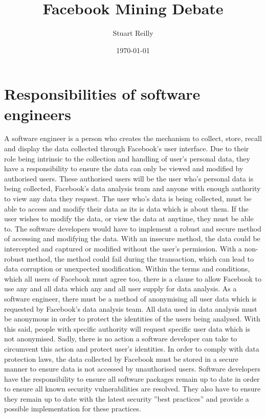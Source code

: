 \documentclass[12pt]{article}
\title{Facebook Mining Debate}
\author{Stuart Reilly}
\date{\today}
\begin{document}
\maketitle
\section{Responsibilities of software engineers}
	A software engineer is a person who creates the mechanism to collect, store, recall and display the data collected through Facebook's user interface.
	Due to their role being intrinsic to the collection and handling of user's personal data, they have a responsibility to ensure the data can only be viewed and modified by authorised users.
	These authorised users will be the user who's personal data is being collected, Facebook's data analysis team and anyone with enough authority to view any data they request.
	The user who's data is being collected, must be able to access and modify their data as its is data which is about them.
	If the user wishes to modify the data, or view the data at anytime, they must be able to.
	The software developers would have to implement a robust and secure method of accessing and modifying the data.
	With an insecure method, the data could be intercepted and captured or modified without the user's permission.
	With a non-robust method, the method could fail during the transaction, which can lead to data corruption or unexpected modification.
	Within the terms and conditions, which all users of Facebook must agree too, there is a clause to allow Facebook to use any and all data which any and all user supply for data analysis.
	As a software engineer, there must be a method of anonymising all user data which is requested by Facebook's data analysis team.
	All data used in data analysis must be anonymous in order to protect the identities of the users being analysed.
	With this said, people with specific authority will request specific user data which is not anonymised.
	Sadly, there is no action a software developer can take to circumvent this action and protect user's identities.
	In order to comply with data protection laws, the data collected by Facebook must be stored in a secure manner to ensure data is not accessed by unauthorised users.
	Software developers have the responsibility to ensure all software packages remain up to date in order to ensure all known security vulnerabilities are resolved.
	They also have to ensure they remain up to date with the latest security ''best practices'' and provide a possible implementation for these practices.
\end{document}
